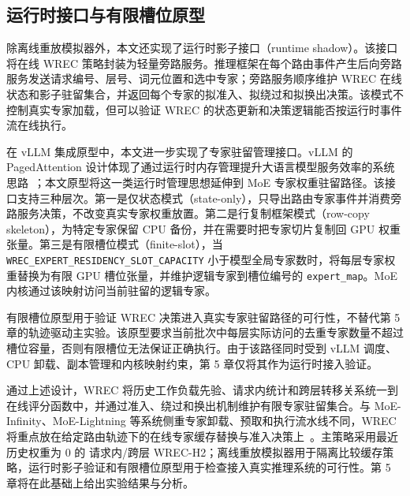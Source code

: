 \subsection{运行时接口与有限槽位原型}

除离线重放模拟器外，本文还实现了运行时影子接口（runtime shadow）。该接口将在线 WREC 策略封装为轻量旁路服务。推理框架在每个路由事件产生后向旁路服务发送请求编号、层号、词元位置和选中专家；旁路服务顺序维护 WREC 在线状态和影子驻留集合，并返回每个专家的拟准入、拟绕过和拟换出决策。该模式不控制真实专家加载，但可以验证 WREC 的状态更新和决策逻辑能否按运行时事件流在线执行。

在 vLLM 集成原型中，本文进一步实现了专家驻留管理接口。vLLM 的 PagedAttention 设计体现了通过运行时内存管理提升大语言模型服务效率的系统思路~\cite{kwon2023pagedattention}；本文原型将这一类运行时管理思想延伸到 MoE 专家权重驻留路径。该接口支持三种层次。第一是仅状态模式（state-only），只导出路由专家事件并消费旁路服务决策，不改变真实专家权重放置。第二是行复制框架模式（row-copy skeleton），为特定专家保留 CPU 备份，并在需要时把专家切片复制回 GPU 权重张量。第三是有限槽位模式（finite-slot），当 \texttt{WREC\_EXPERT\_RESIDENCY\_SLOT\_CAPACITY} 小于模型全局专家数时，将每层专家权重替换为有限 GPU 槽位张量，并维护逻辑专家到槽位编号的 \texttt{expert\_map}。MoE 内核通过该映射访问当前驻留的逻辑专家。

有限槽位原型用于验证 WREC 决策进入真实专家驻留路径的可行性，不替代第 5 章的轨迹驱动主实验。该原型要求当前批次中每层实际访问的去重专家数量不超过槽位容量，否则有限槽位无法保证正确执行。由于该路径同时受到 vLLM 调度、CPU 卸载、副本管理和内核映射约束，第 5 章仅将其作为运行时接入验证。

通过上述设计，WREC 将历史工作负载先验、请求内统计和跨层转移关系统一到在线评分函数中，并通过准入、绕过和换出机制维护有限专家驻留集合。与 MoE-Infinity、MoE-Lightning 等系统侧重专家卸载、预取和执行流水线不同，WREC 将重点放在给定路由轨迹下的在线专家缓存替换与准入决策上~\cite{xue2024moeinfinity,cao2025moelightning}。主策略采用最近历史权重为 $0$ 的 请求内/跨层 WREC-H2；离线重放模拟器用于隔离比较缓存策略，运行时影子验证和有限槽位原型用于检查接入真实推理系统的可行性。第 5 章将在此基础上给出实验结果与分析。
